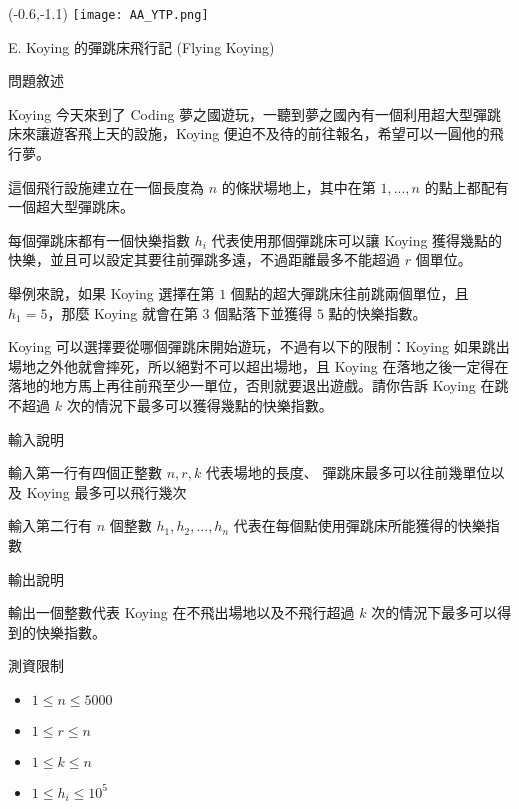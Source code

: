 \documentclass[12pt]{article}
\newcommand{\ProblemTitleFont}{\ProblemTitleMainFont\ProblemTitleCJKFont}
\newcommand{\ProblemTitle}[2]{\noindent\Large{\ProblemTitleFont #1 (#2)}\normalsize\par}
\newcommand{\ProblemSection}[1]{\vspace{0.6cm}\par\noindent\large{\ProblemTitleFont #1}\normalsize\par}
\newcommand{\ProblemStatement}{\ProblemSection{問題敘述}}
\newcommand{\ProblemInput}{\ProblemSection{輸入說明}}
\newcommand{\ProblemOutput}{\ProblemSection{輸出說明}}
\newcommand{\ProblemConstraints}{\ProblemSection{測資限制}}
\begin{document}
\begin{textblock}{0.1}(-0.6,-1.1)
	\texttt{[image: AA\_YTP.png]}
\end{textblock}




\renewcommand{\headrulewidth}{0pt}
\renewcommand{\baselinestretch}{1.3}
\setlength\parindent{24pt}
\setlength\parskip{12pt}
\cfoot{\thepage}

\ProblemTitle{E. Koying 的彈跳床飛行記}{Flying Koying}

\ProblemStatement

Koying 今天來到了 Coding 夢之國遊玩，一聽到夢之國內有一個利用超大型彈跳床來讓遊客飛上天的設施，Koying 便迫不及待的前往報名，希望可以一圓他的飛行夢。

這個飛行設施建立在一個長度為 $n$ 的條狀場地上，其中在第 $1,...,n$ 的點上都配有一個超大型彈跳床。

每個彈跳床都有一個快樂指數 $h_i$ 代表使用那個彈跳床可以讓 Koying 獲得幾點的快樂，並且可以設定其要往前彈跳多遠，不過距離最多不能超過 $r$ 個單位。

舉例來說，如果 Koying 選擇在第 $1$ 個點的超大彈跳床往前跳兩個單位，且 $h_1 = 5$，那麼 Koying 就會在第 $3$ 個點落下並獲得 $5$ 點的快樂指數。

Koying 可以選擇要從哪個彈跳床開始遊玩，不過有以下的限制：Koying 如果跳出場地之外他就會摔死，所以絕對不可以超出場地，且 Koying 在落地之後一定得在落地的地方馬上再往前飛至少一單位，否則就要退出遊戲。請你告訴 Koying 在跳不超過 $k$ 次的情況下最多可以獲得幾點的快樂指數。

\ProblemInput

輸入第一行有四個正整數 $n,r,k$ 代表場地的長度、 彈跳床最多可以往前幾單位以及 Koying 最多可以飛行幾次

輸入第二行有 $n$ 個整數 $h_1,h_2,...,h_n$ 代表在每個點使用彈跳床所能獲得的快樂指數

\ProblemOutput

輸出一個整數代表 Koying 在不飛出場地以及不飛行超過 $k$ 次的情況下最多可以得到的快樂指數。

\clearpage

\ProblemConstraints

\begin{itemize}
    \item $1 \le n \le 5000$
    \item $1 \le r \le n$
    \item $1 \le k \le n$
    \item $1 \le h_i \le 10^5$
\end{itemize}
\end{document}
